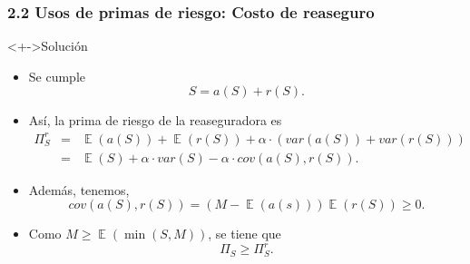 \documentclass[cjk,t,compress]{beamer}
\newcommand{\field}[1]{\mathbb{#1}}
\newcommand{\expec}{\operatorname{\field{E}}}
\renewcommand{\min}{\operatorname{\text{min}}}
\begin{document}
\begin{frame}[fragile]
	\frametitle{2.2 Usos de primas de riesgo: Costo de reaseguro}
	\scriptsize  	
		
		\vspace{0.1cm}
		\begin{block}<+->{Soluci\'on}
		\vspace{0.3cm}
		\begin{itemize}
		  \item Se cumple
		  \begin{equation}
		 	S = a(S)+r(S).
			\nonumber
		  \end{equation}
		  \item As\'i, la prima de riesgo de la reaseguradora es
		  \begin{eqnarray}
		    \Pi^{r}_{S} 
		    		& = & 
		    		\expec\left(a(S)\right) 
		    		+ \expec \left(r(S)\right)
		    		+ \alpha 
		    		\cdot 
		    		\left( var\left(a(S)\right) + var\left(r(S)\right) \right)
		    		\nonumber \\
		    		& = &
		    		\expec(S) 
		    		+ \alpha \cdot var(S)
		    		- \alpha \cdot cov\left(a(S),r(S)\right). 
		    		\nonumber
		  \end{eqnarray}
		  \item Adem\'as, tenemos,
		  \begin{equation}
		    cov\left(a(S),r(S)\right) = \left(M-\expec(a(s))\right)\expec(r(S)) \geq 0.
		    \nonumber
		  \end{equation}
		  \item Como $M \geq \expec\left(\min(S,M)\right)$,
		  se tiene que 
		  \begin{equation}
		  \Pi_{S} \geq \Pi^{r}_{S}.
		  \nonumber
		  \end{equation}
		\end{itemize}
		\end{block}
		  	
\end{frame}
\end{document}
